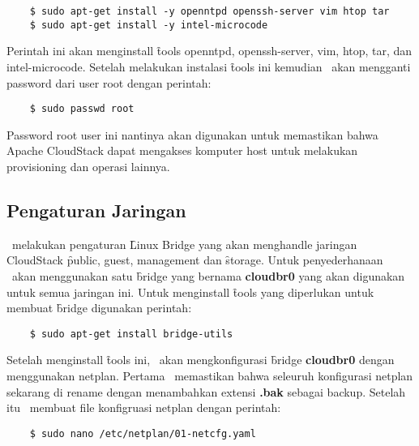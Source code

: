 \begin{listing}[H]
    \begin{verbatim}
    $ sudo apt-get install -y openntpd openssh-server vim htop tar
    $ sudo apt-get install -y intel-microcode
    \end{verbatim}
\end{listing}

Perintah ini akan menginstall \f{tools} openntpd, openssh-server, vim, htop, tar, dan intel-microcode. Setelah melakukan instalasi \f{tools} ini kemudian \saya\ akan mengganti password dari user root dengan perintah:

\begin{listing}[H]
    \begin{verbatim}
    $ sudo passwd root
    \end{verbatim}
\end{listing}

Password root user ini nantinya akan digunakan untuk memastikan bahwa Apache CloudStack dapat mengakses komputer host untuk melakukan provisioning \vm dan operasi lainnya.
\subsection{Pengaturan Jaringan}
\saya\ melakukan pengaturan \f{Linux Bridge} yang akan menghandle jaringan CloudStack \f{public, guest, management} dan \f{storage}. Untuk penyederhanaan \saya\ akan menggunakan satu \f{bridge} yang bernama \textbf{cloudbr0} yang akan digunakan untuk semua jaringan ini. Untuk menginstall \f{tools} yang diperlukan untuk membuat \f{bridge} digunakan perintah:

\begin{listing}[H]
    \begin{verbatim}      
    $ sudo apt-get install bridge-utils
    \end{verbatim}
\end{listing}

Setelah menginstall \f{tools} ini, \saya\ akan mengkonfigurasi \f{bridge} \textbf{cloudbr0} dengan menggunakan netplan. Pertama \saya\ memastikan bahwa seleuruh konfigurasi netplan sekarang di rename dengan menambahkan extensi \textbf{.bak} sebagai backup. Setelah itu \saya\ membuat file konfigruasi netplan dengan perintah:

\begin{listing}[H]
    \begin{verbatim}     
    $ sudo nano /etc/netplan/01-netcfg.yaml
    \end{verbatim}
\end{listing}

